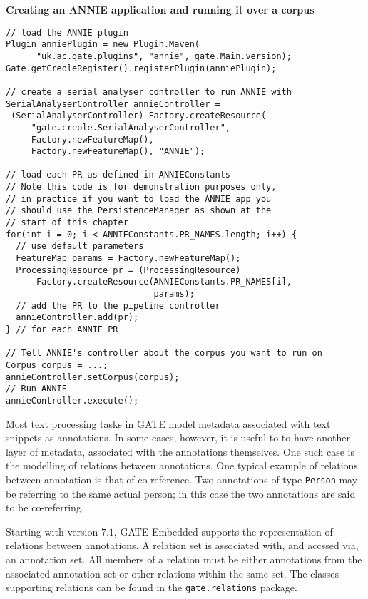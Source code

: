 {\bf Creating an ANNIE application and running it over a corpus}


\begin{lstlisting}
// load the ANNIE plugin
Plugin anniePlugin = new Plugin.Maven(
      "uk.ac.gate.plugins", "annie", gate.Main.version);
Gate.getCreoleRegister().registerPlugin(anniePlugin);

// create a serial analyser controller to run ANNIE with
SerialAnalyserController annieController =
 (SerialAnalyserController) Factory.createResource(
     "gate.creole.SerialAnalyserController",
     Factory.newFeatureMap(),
     Factory.newFeatureMap(), "ANNIE");

// load each PR as defined in ANNIEConstants
// Note this code is for demonstration purposes only,
// in practice if you want to load the ANNIE app you
// should use the PersistenceManager as shown at the
// start of this chapter
for(int i = 0; i < ANNIEConstants.PR_NAMES.length; i++) {
  // use default parameters
  FeatureMap params = Factory.newFeatureMap();
  ProcessingResource pr = (ProcessingResource)
      Factory.createResource(ANNIEConstants.PR_NAMES[i],
                             params);
  // add the PR to the pipeline controller
  annieController.add(pr);
} // for each ANNIE PR

// Tell ANNIE's controller about the corpus you want to run on
Corpus corpus = ...;
annieController.setCorpus(corpus);
// Run ANNIE
annieController.execute();
\end{lstlisting}



Most text processing tasks in GATE model metadata associated with text snippets
as annotations. In some cases, however, it is useful to to have another layer of
metadata, associated with the annotations themselves. One such case is the
modelling of relations between annotations. One typical example of relations
between annotation is that of co-reference. Two annotations of type {\tt Person}
may be referring to the same actual person; in this case the two annotations are
said to be co-referring.

Starting with version $7.1$, GATE Embedded supports the representation of
relations between annotations. A relation set is associated with, and accssed via,
an annotation set. All members of a relation must be either annotations from the
associated annotation set or other relations within the same set.
The classes supporting relations can be found in the \lstinline!gate.relations!
package.

